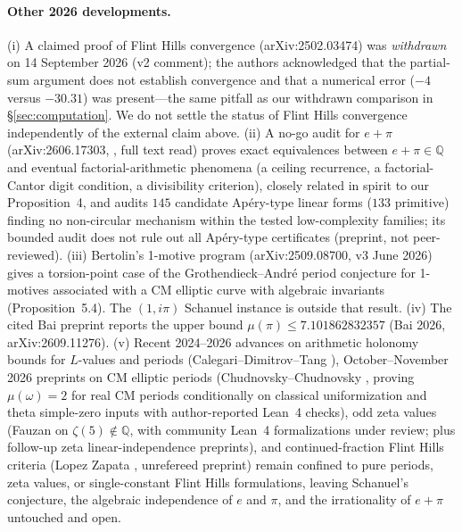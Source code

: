 \documentclass[11pt]{amsart}
\theoremstyle{definition}
\theoremstyle{remark}
\numberwithin{equation}{section}
\newcommand{\Q}{\mathbb{Q}}
\newcommand{\irr}{\mu}
\begin{document}
\paragraph{Other 2026 developments.} (i) A claimed proof of Flint Hills convergence (arXiv:2502.03474) was \emph{withdrawn} on 14 September 2026 (v2 comment); the authors acknowledged that the partial-sum argument does not establish convergence and that a numerical error ($-4$ versus $-30.31$) was present---the same pitfall as our withdrawn comparison in \S\ref{sec:computation}. We do not settle the status of Flint Hills convergence independently of the external claim above. (ii) A no-go audit for $e+\pi$ (arXiv:2606.17303, \cite{Yu2026}, full text read) proves exact equivalences between $e+\pi\in\Q$ and eventual factorial-arithmetic phenomena (a ceiling recurrence, a factorial-Cantor digit condition, a divisibility criterion), closely related in spirit to our Proposition~4, and audits $145$ candidate Ap\'ery-type linear forms ($133$ primitive) finding no non-circular mechanism within the tested low-complexity families; its bounded audit does not rule out all Ap\'ery-type certificates (preprint, not peer-reviewed). (iii) Bertolin's 1-motive program (arXiv:2509.08700, v3 June 2026) \cite{BertolinMotives} gives a torsion-point case of the Grothendieck--Andr\'e period conjecture for 1-motives associated with a CM elliptic curve with algebraic invariants (Proposition~5.4). The $(1,i\pi)$ Schanuel instance is outside that result. (iv) The cited Bai preprint reports the upper bound $\irr(\pi)\le 7.101862832357$ (Bai 2026, arXiv:2609.11276). (v) Recent 2024--2026 advances on arithmetic holonomy bounds for $L$-values and periods (Calegari--Dimitrov--Tang \cite{CDT2026}), October--November 2026 preprints on CM elliptic periods (Chudnovsky--Chudnovsky \cite{Chudnovsky2026}, proving $\irr(\omega)=2$ for real CM periods conditionally on classical uniformization and theta simple-zero inputs with author-reported Lean~4 checks), odd zeta values (Fauzan \cite{Fauzan2026} on $\zeta(5)\notin\Q$, with community Lean~4 formalizations under review; plus follow-up zeta linear-independence preprints), and continued-fraction Flint Hills criteria (Lopez Zapata \cite{Zapata2026}, unrefereed preprint) remain confined to pure periods, zeta values, or single-constant Flint Hills formulations, leaving Schanuel's conjecture, the algebraic independence of $e$ and $\pi$, and the irrationality of $e+\pi$ untouched and open.
\end{document}
